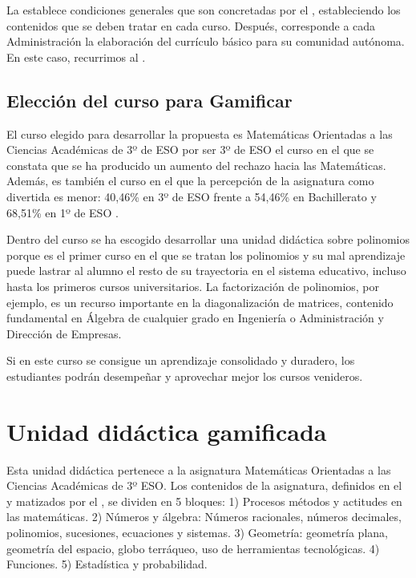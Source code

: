La \lomce establece condiciones generales que son concretadas por el \boe, estableciendo los contenidos que se deben tratar en cada curso.
%
Después, corresponde a cada Administración la elaboración del currículo básico para su comunidad autónoma.
%
En este caso, recurrimos al \bocm.


\subsection{Elección del curso para Gamificar}

El curso elegido para desarrollar la propuesta es Matemáticas Orientadas a las Ciencias Académicas de 3º de ESO por ser 3º de ESO el curso en el que se constata que se ha producido un aumento del rechazo hacia las Matemáticas.
%
Además, es también el curso en el que la percepción de la asignatura como divertida es menor: 40,46\% en 3º de ESO frente a 54,46\% en Bachillerato y 68,51\% en 1º de ESO \citep{ActitudesHaciaMates}.

Dentro del curso se ha escogido desarrollar una unidad didáctica sobre polinomios porque es el primer curso en el que se tratan los polinomios y su mal aprendizaje puede lastrar al alumno el resto de su trayectoria en el sistema educativo, incluso hasta los primeros cursos universitarios.
%
La factorización de polinomios, por ejemplo, es un recurso importante en la diagonalización de matrices, contenido fundamental en Álgebra de cualquier grado en Ingeniería o Administración y Dirección de Empresas.


Si en este curso se consigue un aprendizaje consolidado y duradero, los estudiantes podrán desempeñar y aprovechar mejor los cursos venideros.


\section{Unidad didáctica gamificada}

\label{sec:UD}
%
Esta unidad didáctica pertenece a la asignatura Matemáticas Orientadas a las Ciencias Académicas de 3º ESO. 
%
Los contenidos de la asignatura, definidos en el \boe y matizados por el \bocm, se dividen en 5 bloques:
1) Procesos métodos y actitudes en las matemáticas. 
2) Números y álgebra: Números racionales, números decimales, polinomios, sucesiones, ecuaciones y sistemas.
3) Geometría: geometría plana, geometría del espacio, globo terráqueo, uso de herramientas tecnológicas.
4) Funciones.
5) Estadística y probabilidad.

